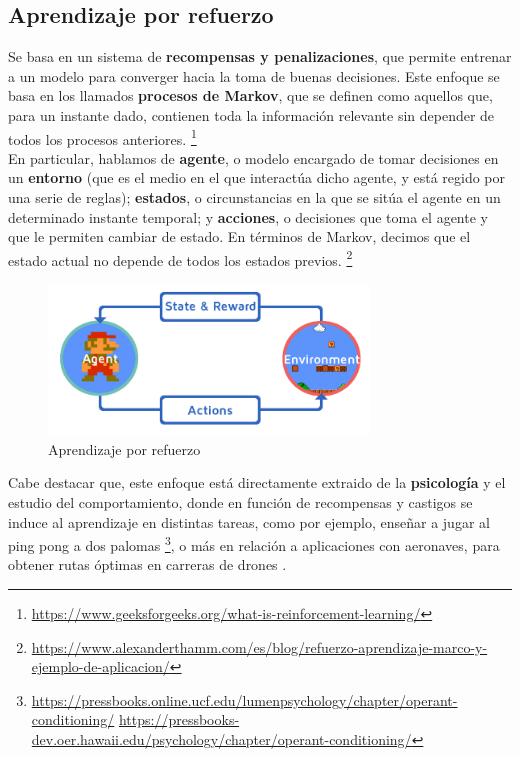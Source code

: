 \subsection{Aprendizaje por refuerzo}
\label{subsec:aprendizaje_por_refuerzo}

Se basa en un sistema de \textbf{recompensas y penalizaciones}, que permite entrenar a un modelo para converger hacia la toma de buenas decisiones. Este enfoque se basa en los llamados \textbf{procesos de Markov}, que se definen como aquellos que, para un instante dado, contienen toda la información relevante sin depender de todos los procesos anteriores. \footnote[17]{\url{https://www.geeksforgeeks.org/what-is-reinforcement-learning/}}\\

En particular, hablamos de \textbf{agente}, o modelo encargado de tomar decisiones en un \textbf{entorno} (que es el medio en el que interactúa dicho agente, y está regido por una serie de reglas); \textbf{estados}, o circunstancias en la que se sitúa el agente en un determinado instante temporal; y \textbf{acciones}, o decisiones que toma el agente y que le permiten cambiar de estado. En términos de Markov, decimos que el estado actual no depende de todos los estados previos. \footnote[18]{\url{https://www.alexanderthamm.com/es/blog/refuerzo-aprendizaje-marco-y-ejemplo-de-aplicacion/}}\\

\begin{figure} [H]
	\begin{center}
	\includegraphics[height=4cm]{imagenes/cap1/9_reinforcement.png}
	\end{center}
	\caption[Aprendizaje por refuerzo]{Aprendizaje por refuerzo}
	\label{fig:reinforcement_learning}
\end{figure}

Cabe destacar que, este enfoque está directamente extraido de la \textbf{psicología} y el estudio del comportamiento, donde en función de recompensas y castigos se induce al aprendizaje en distintas tareas, como por ejemplo, enseñar a jugar al ping pong a dos palomas \footnote[19]{\url{https://pressbooks.online.ucf.edu/lumenpsychology/chapter/operant-conditioning/} \url{https://pressbooks-dev.oer.hawaii.edu/psychology/chapter/operant-conditioning/}}, o más en relación a aplicaciones con aeronaves, para obtener rutas óptimas en carreras de drones \cite{9636053}.\\

